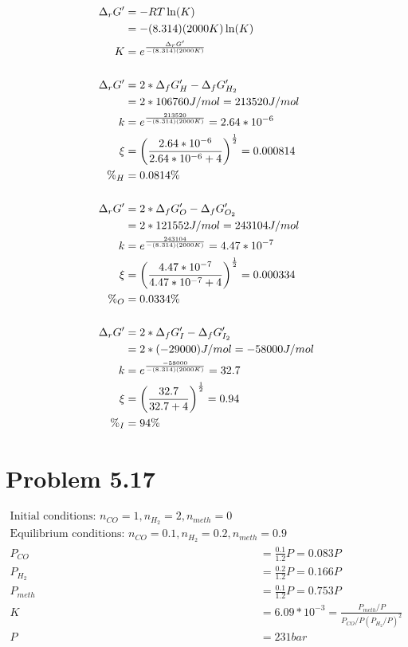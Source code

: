 \documentclass[10pt]{article} %
\begin{document}
\begin{align*}
  \Delta_rG' &= -RT\ln(K)\\
  &= -(8.314)(2000K)\ln(K)\\
  K &= e^\frac{\Delta_rG'}{-(8.314)(2000K)}\\
  \vspace{1cm}\\
  \Delta_rG' &= 2*\Delta_fG'_{H} - \Delta_fG'_{H_2}\\
  &= 2*106760 J/mol = 213520 J/mol\\
  k &= e^\frac{213520}{-(8.314)(2000K)} = 2.64*10^{-6}\\
  \xi &= \left(\frac{2.64*10^{-6}}{2.64*10^{-6}+4}\right)^\frac{1}{2} = 0.000814\\
  \%_{H} &= 0.0814\%\\
  \vspace{1cm}\\
  \Delta_rG' &= 2*\Delta_fG'_{O} - \Delta_fG'_{O_2}\\
  &= 2*121552 J/mol = 243104 J/mol\\
  k &= e^\frac{243104}{-(8.314)(2000K)} = 4.47*10^{-7}\\
  \xi &= \left(\frac{4.47*10^{-7}}{4.47*10^{-7}+4}\right)^\frac{1}{2} = 0.000334\\
  \%_{O} &= 0.0334\%\\
  \vspace{1cm}\\
  \Delta_rG' &= 2*\Delta_fG'_{I} - \Delta_fG'_{I_2}\\
  &= 2*(-29000) J/mol = -58000 J/mol\\
  k &= e^\frac{-58000}{-(8.314)(2000K)} = 32.7\\
  \xi &= \left(\frac{32.7}{32.7+4}\right)^\frac{1}{2} = 0.94\\
  \%_{I} &= 94\%\\
\end{align*}

\section{Problem 5.17}
\begin{align*}
  \mbox{Initial conditions: } n_{CO} = 1, n_{H_2} = 2, n_{meth} = 0\\
  \mbox{Equilibrium conditions: } n_{CO} = 0.1, n_{H_2} = 0.2, n_{meth} = 0.9\\
  P_{CO} &= \frac{0.1}{1.2}P = 0.083P\\
  P_{H_2} &= \frac{0.2}{1.2}P = 0.166P\\
  P_{meth} &= \frac{0.1}{1.2}P = 0.753P\\
  K &= 6.09*10^{-3} = \frac{P_{meth}/P}{P_{CO}/P(P_{H_2}/P)^2}\\
  P &= 231 bar\\
\end{align*}
\end{document}
